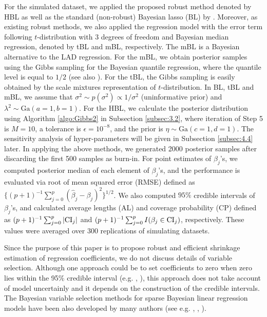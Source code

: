 \documentclass[11pt]{article}
\theoremstyle{plain}
\theoremstyle{definition}
\begin{document}
For the simulated dataset, we applied the proposed robust method denoted by HBL as well as the standard (non-robust) Bayesian lasso (BL) by \cite{PC08}.
Moreover, as existing robust methods, we also applied the regression model with the error term following $t$-distribution with $3$ degrees of freedom and Bayesian median regression, denoted by tBL and mBL, respectively. The mBL is a Bayesian alternative to the LAD regression. For the mBL, we obtain posterior samples using the Gibbs sampling for the Bayesian quantile regression, where the quantile level is equal to $1/2$ (see also \cite{KK11}). For the tBL, the Gibbs sampling is easily obtained by the scale mixtures representation of $t$-distribution. In BL, tBL and mBL, we assume that $\sigma^2 \sim p(\sigma^2) \propto 1/\sigma^2$ (uninformative prior) and $\lambda^2 \sim \mathrm{Ga}(a=1,b=1)$. For the HBL, we calculate the posterior distribution using Algorithm \ref{algo:Gibbs2} in Subsection \ref{subsec:3.2}, where iteration of Step 5 is $M=10$, a tolerance is $\epsilon=10^{-8}$, and the prior is $\eta\sim \mathrm{Ga}(c=1,d=1)$. The sensitivity analysis of hyper-parameters will be  given in Subsection \ref{subsec:4.4} later. 
In applying the above methods, we generated 2000 posterior samples after discarding the first 500 samples as burn-in.
For point estimates of $\beta_j$'s, we computed posterior median of each element of $\beta_j$'s, and the performance is evaluated via root of mean squared error (RMSE) defined as $\{(p+1)^{-1}\sum_{j=0}^p(\widehat{\beta}_j-\beta_j)^2\}^{1/2}$.  
We also computed $95\%$ credible intervals of $\beta_j$'s, and calculated average lengths (AL) and coverage probability (CP) defined as $(p+1)^{-1}\sum_{j=0}^p|{\rm CI}_j|$ and $(p+1)^{-1}\sum_{j=0}^p I(\beta_j\in {\rm CI}_j)$, respectively. These values were averaged over 300 replications of simulating datasets.

Since the purpose of this paper is to  propose robust and efficient shrinkage estimation of regression coefficients, we do not discuss details of variable selection. Although one approach could be to set coefficients to zero when zero lies within the 95\% credible interval (e.g. \cite{PC08}, \cite{FKK10}), this approach does not take account of model uncertainly and it depends on the construction of the credible intervals. The Bayesian variable selection methods for sparse Bayesian linear regression models have been also developed by many authors (see e.g. \cite{GM97}, \cite{KM98}, \cite{LN13}).
\end{document}
